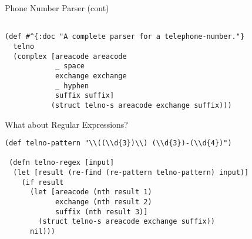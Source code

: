 \documentclass[presentation]{beamer}
\begin{document}
\begin{frame}[fragile]{Phone Number Parser (cont)}
\begin{verbatim}

(def #^{:doc "A complete parser for a telephone-number."}
  telno
  (complex [areacode areacode
            _ space
            exchange exchange
            _ hyphen
            suffix suffix]
           (struct telno-s areacode exchange suffix)))

\end{verbatim}
\end{frame}

\begin{frame}[fragile]{What about Regular Expressions?}

\begin{verbatim}
(def telno-pattern "\\((\\d{3})\\) (\\d{3})-(\\d{4})")

 (defn telno-regex [input]
  (let [result (re-find (re-pattern telno-pattern) input)]
    (if result
      (let [areacode (nth result 1)
            exchange (nth result 2)
            suffix (nth result 3)]
        (struct telno-s areacode exchange suffix))
      nil)))
\end{verbatim}
\end{frame}
\end{document}
